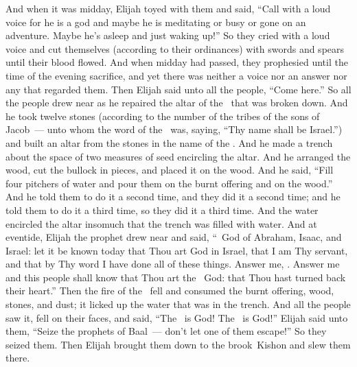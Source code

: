 \begin{inparaenum}
   And when it was midday, Elijah toyed with them and said, ``Call with a loud voice for he is a god and maybe he is meditating or busy or gone on an adventure. Maybe he's asleep and just waking up!''%
   So they cried with a loud voice and cut themselves (according to their ordinances) with swords and spears until their blood flowed.%
   And when midday had passed, they prophesied until the time of the evening sacrifice, and yet there was neither a voice nor an answer nor any that regarded them.%
   Then Elijah said unto all the people, ``Come here.'' So all the people drew near as he repaired the altar of the \lord\ that was broken down.%
   And he took twelve stones (according to the number of the tribes of the sons of Jacob~--- unto whom the word of the \lord\ was, saying, ``Thy name shall be Israel.'')%
   and built an altar from the stones in the name of the \lord. And he made a trench about the space of two measures of seed encircling the altar.%
   And he arranged the wood, cut the bullock in pieces, and placed it on the wood.%
    And he said, ``Fill four pitchers of water and pour them on the burnt offering and on the wood.'' And he told them to do it a second time, and they did it a second time; and he told them to do it a third time, so they did it a third time.%
    And the water encircled the altar insomuch that the trench was filled with water.%
   And at eventide, Elijah the prophet drew near and said, ``\lord\ God of Abraham, Isaac, and Israel: let it be known today that Thou art God in Israel, that I am Thy servant, and that by Thy word I have done all of these things.%
   Answer me, \lord. Answer me and this people shall know that Thou art the \lord\ God: that Thou hast turned back their heart.''%
   Then the fire of the \lord\ fell and consumed the burnt offering, wood, stones, and dust; it licked up the water that was in the trench.%
   And all the people saw it, fell on their faces, and said, ``The \lord\ is God! The \lord\ is God!''%
   Elijah said unto them, ``Seize the prophets of Baal~--- don't let one of them escape!'' So they seized them. Then Elijah brought them down to the brook~Kishon and slew them there.%

\end{inparaenum}

